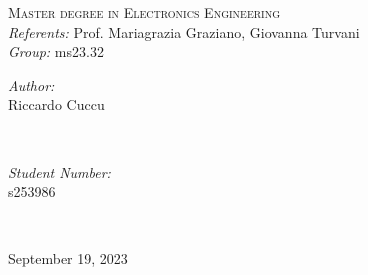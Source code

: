 \begin{titlepage}
        \textsc{\large Master degree in Electronics Engineering} \\ [1 cm]

        {\large \emph{Referents:} Prof. Mariagrazia Graziano, Giovanna Turvani}\\ [1.5 cm]
        
        {\large \emph{Group:} ms23.32} \\ [0.5 cm]
 
	\begin{minipage}{0.4\textwidth}
		\begin{flushleft} \large
			\emph{Author:}\\
			Riccardo Cuccu
			\end{flushleft}
			\end{minipage}~
			\begin{minipage}{0.4\textwidth}
			\begin{flushright} \large
			\emph{Student Number:} \\						%
			s253986 \\
		\end{flushright}
	\end{minipage}\\[1 cm]


	\vfill

	{\large September 19, 2023}\\[2 cm]

	
\end{titlepage}